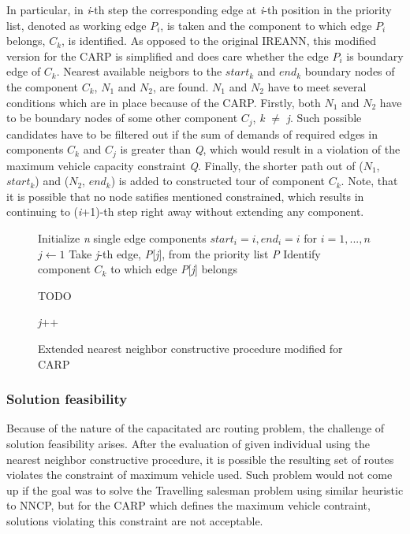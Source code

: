 \documentclass[twoside]{ctuthesis}
\theoremstyle{plain}
\theoremstyle{definition}
\theoremstyle{note}
\begin{document}
In particular, in \emph{i}-th step the corresponding edge at \emph{i}-th position in the priority list, denoted as working edge \emph{$P_i$}, is taken and the component to which edge \emph{$P_i$} belongs, \emph{$C_k$}, is identified. As opposed to the original IREANN, this modified version for the CARP is simplified and does care whether the edge \emph{$P_i$} is boundary edge of \emph{$C_k$}. Nearest available neigbors to the \emph{$start_k$} and \emph{$end_k$} boundary nodes of the component \emph{$C_k$}, \emph{$N_1$} and \emph{$N_2$}, are found. \emph{$N_1$} and \emph{$N_2$} have to meet several conditions which are in place because of the CARP. Firstly, both \emph{$N_1$} and \emph{$N_2$} have to be boundary nodes of some other component \emph{$C_j$}, \emph{k} $\neq$ \emph{j}. Such possible candidates have to be filtered out if the sum of demands of required edges in components \emph{$C_k$} and \emph{$C_j$} is greater than \emph{Q}, which would result in a violation of the maximum vehicle capacity constraint \emph{Q}. Finally, the shorter path out of (\emph{$N_1$}, \emph{$start_k$}) and (\emph{$N_2$}, \emph{$end_k$}) is added to constructed tour of component \emph{$C_k$}. Note, that it is possible that no node satifies mentioned constrained, which results in continuing to (\emph{i}+1)-th step right away without extending any component.





	
\begin{figure}
\begin{algorithmic}[1]
	\State Initialize \emph{n} single edge components \emph{$ start_i = i, end_i = i $} for \emph{$ i = 1, ..., n $}
	\State $j \gets 1$
	\State Take \emph{j}-th edge, \emph{P}[\emph{j}], from the priority list \emph{P}
	\State Identify component \emph{$ C_k $} to which edge \emph{P}[\emph{j}] belongs
	
	TODO
	
	\State \emph{j}++
	\EndWhile
	
	
\end{algorithmic}
	\caption{Extended nearest neighbor constructive procedure modified for CARP}
\label{fig:cnnpcarp}
\end{figure}


 

\subsubsection{Solution feasibility}
Because of the nature of the capacitated arc routing problem, the challenge of solution feasibility arises. After the evaluation of given individual using the nearest neighbor constructive procedure, it is possible the resulting set of routes violates the constraint of maximum vehicle used. Such problem would not come up if the goal was to solve the Travelling salesman problem using similar heuristic to NNCP, but for the CARP which defines the maximum vehicle contraint, solutions violating this constraint are not acceptable. 
\end{document}
